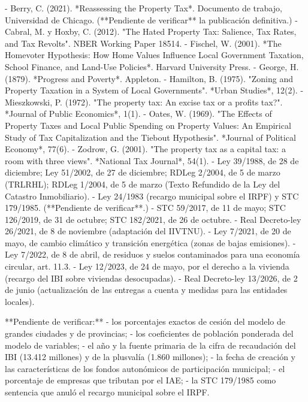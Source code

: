 \documentclass[10pt,a4paper]{article}
\begin{document}
{- Berry, C. (2021). *Reassessing the Property Tax*. Documento de trabajo, Universidad de Chicago. (**Pendiente de verificar** la publicación definitiva.)
- Cabral, M. y Hoxby, C. (2012). "The Hated Property Tax: Salience, Tax Rates, and Tax Revolts". NBER Working Paper 18514.
- Fischel, W. (2001). *The Homevoter Hypothesis: How Home Values Influence Local Government Taxation, School Finance, and Land-Use Policies*. Harvard University Press.
- George, H. (1879). *Progress and Poverty*. Appleton.
- Hamilton, B. (1975). "Zoning and Property Taxation in a System of Local Governments". *Urban Studies*, 12(2).
- Mieszkowski, P. (1972). "The property tax: An excise tax or a profits tax?". *Journal of Public Economics*, 1(1).
- Oates, W. (1969). "The Effects of Property Taxes and Local Public Spending on Property Values: An Empirical Study of Tax Capitalization and the Tiebout Hypothesis". *Journal of Political Economy*, 77(6).
- Zodrow, G. (2001). "The property tax as a capital tax: a room with three views". *National Tax Journal*, 54(1).
- Ley 39/1988, de 28 de diciembre; Ley 51/2002, de 27 de diciembre; RDLeg 2/2004, de 5 de marzo (TRLRHL); RDLeg 1/2004, de 5 de marzo (Texto Refundido de la Ley del Catastro Inmobiliario).
- Ley 24/1983 (recargo municipal sobre el IRPF) y STC 179/1985. (**Pendiente de verificar**.)
- STC 59/2017, de 11 de mayo; STC 126/2019, de 31 de octubre; STC 182/2021, de 26 de octubre.
- Real Decreto-ley 26/2021, de 8 de noviembre (adaptación del IIVTNU).
- Ley 7/2021, de 20 de mayo, de cambio climático y transición energética (zonas de bajas emisiones).
- Ley 7/2022, de 8 de abril, de residuos y suelos contaminados para una economía circular, art. 11.3.
- Ley 12/2023, de 24 de mayo, por el derecho a la vivienda (recargo del IBI sobre viviendas desocupadas).
- Real Decreto-ley 13/2026, de 2 de junio (actualización de las entregas a cuenta y medidas para las entidades locales).

**Pendiente de verificar:**
- los porcentajes exactos de cesión del modelo de grandes ciudades y de provincias;
- los coeficientes de población ponderada del modelo de variables;
- el año y la fuente primaria de la cifra de recaudación del IBI (13.412 millones) y de la plusvalía (1.860 millones);
- la fecha de creación y las características de los fondos autonómicos de participación municipal;
- el porcentaje de empresas que tributan por el IAE;
- la STC 179/1985 como sentencia que anuló el recargo municipal sobre el IRPF.

}
\end{document}
